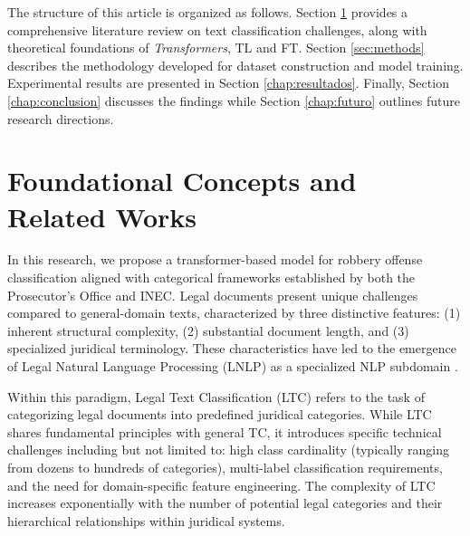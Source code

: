 \documentclass[runningheads]{llncs}
\begin{document}
The structure of this article is organized as follows. Section
\ref{chap:literatura} provides a comprehensive literature review on
text classification challenges, along with theoretical foundations of
\emph{Transformers}, TL and FT. Section
\ref{sec:methods} describes the methodology developed for dataset
construction and model training. Experimental results are presented in
Section \ref{chap:resultados}. Finally, Section \ref{chap:conclusion}
discusses the findings while Section \ref{chap:futuro} outlines future
research directions.

\section{Foundational Concepts and Related Works}\label{chap:literatura}
In this research, we propose a transformer-based model for robbery
offense classification aligned with categorical frameworks established
by both the Prosecutor's Office and INEC.  Legal documents present
unique challenges compared to general-domain texts, characterized by
three distinctive features: (1) inherent structural complexity, (2)
substantial document length, and (3) specialized juridical
terminology. These characteristics have led to the emergence of Legal
Natural Language Processing (LNLP) as a specialized NLP subdomain
\cite{Ariai2024,Zhong2020}.

Within this paradigm, Legal Text Classification (LTC) refers to the
task of categorizing legal documents into predefined juridical
categories. While LTC shares fundamental principles with general TC,
it introduces specific technical challenges including but not limited
to: high class cardinality (typically ranging from dozens to hundreds
of categories), multi-label classification requirements, and the need
for domain-specific feature engineering. The complexity of LTC
increases exponentially with the number of potential legal categories
and their hierarchical relationships within juridical systems.



\end{document}
